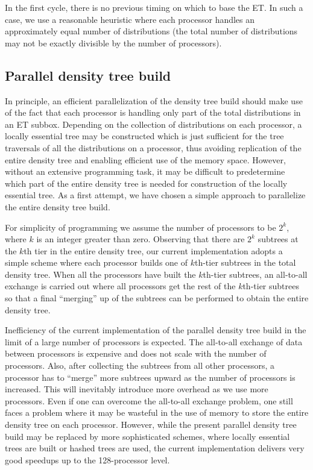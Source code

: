 \commentoutA{\documentclass[prl,aps,twocolumn,twocolumngrid,superbib]{revtex4}}
\begin{document}
In the first cycle, there is no previous timing on which to base the
ET. In such a case, we use a reasonable heuristic where each processor
handles an approximately equal number of distributions (the total
number of distributions may not be exactly divisible by the number of
processors).

\subsection{Parallel density tree build} 
\label{sec:parallelTB}

In principle, an efficient parallelization of the density tree build
should make use of the fact that each processor is handling only part
of the total distributions in an ET subbox.  Depending on the
collection of distributions on each processor, a locally essential
tree may be constructed which is just sufficient for the tree
traversals of all the distributions on a
processor\cite{MWarren92,CGan03}, thus avoiding replication of the
entire density tree and enabling efficient use of the memory space.
However, without an extensive programming task, it may be difficult to
predetermine which part of the entire density tree is needed for
construction of the locally essential tree. As a first attempt, we
have chosen a simple approach to parallelize the entire density tree
build.

For simplicity of programming we assume the number of processors to be
$2^k$, where $k$ is an integer greater than zero.  Observing that
there are $2^k$ subtrees at the $k$th tier in the entire density tree,
our current implementation adopts a simple scheme where each processor
builds one of $k$th-tier subtrees in the total density tree. When all
the processors have built the $k$th-tier subtrees, an all-to-all
exchange is carried out where all processors get the rest of the
$k$th-tier subtrees so that a final ``merging'' up of the
subtrees\cite{MChallacombe97,CTymczak04a} can be performed to obtain
the entire density tree.

Inefficiency of the current implementation of the parallel density
tree build in the limit of a large number of processors is expected.
The all-to-all exchange of data between processors is expensive and
does not scale with the number of processors. Also, after collecting
the subtrees from all other processors, a processor has to ``merge''
more subtrees upward as the number of processors is increased. This
will inevitably introduce more overhead as we use more processors.
Even if one can overcome the all-to-all exchange problem, one still
faces a problem where it may be wasteful in the use of memory to store
the entire density tree on each processor.  However, while the present
parallel density tree build may be replaced by more sophisticated
schemes, where locally essential trees are built\cite{MWarren92} or
hashed trees are used\cite{MWarren93,MWarren95b}, the current
implementation delivers very good speedups up to the 128-processor
level.
\end{document}
